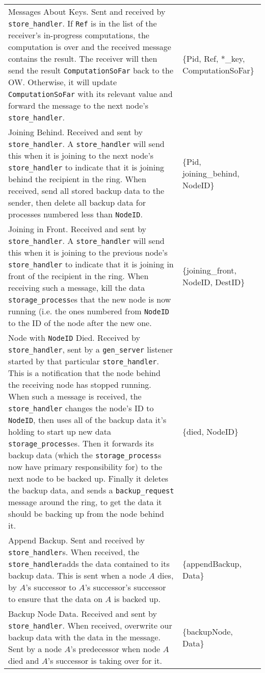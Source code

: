 \documentclass[12pt,letterpaper]{article}
\renewcommand{\tt}[1]{\texttt{#1}}
\newcommand{\sh}{\tt{store\_handler}}
\renewcommand{\sp}{\tt{storage\_process}}
\newcommand{\gs}{\tt{gen\_server}}
\begin{document}
\begin{longtable}{p{4.5in}T}
Messages About Keys.  Sent and received by \sh.  If \tt{Ref} is in the list of the receiver's in-progress computations, the computation is over and the received message contains the result. The receiver will then send the result \tt{ComputationSoFar} back to the OW.  Otherwise, it will update \tt{ComputationSoFar} with its relevant value and forward the message to the next node's \sh.  &
\{Pid, Ref, *\_key, ComputationSoFar\} \\

Joining Behind. Received and sent by \sh. A \sh{} will send this when it is joining to the next node's \sh{} to indicate that it is joining behind the recipient in the ring. When received, send all stored backup data to the sender, then delete all backup data for processes numbered less than \tt{NodeID}. &
\{Pid, joining\_behind, NodeID\} \\

Joining in Front.  Received and sent by \sh. A \sh{} will send this when it is joining to the previous node's \sh{} to indicate that it is joining in front of the recipient in the ring. When receiving such a message, %
kill the data \sp es that the new node is now running (i.e. the ones numbered from \tt{NodeID} to the ID of the node after the new one. &
\{joining\_front, NodeID, DestID\} \\

Node with \tt{NodeID} Died.  Received by \sh, sent by a \gs{} listener started by that particular \sh. This is a notification that the node behind the receiving node has stopped running. When such a message is received, the \sh{} changes the node's ID to \tt{NodeID}, then uses all of the backup data it's holding to start up new data \sp es. Then it forwards its backup data (which the \sp s now have primary responsibility for) to the next node to be backed up. Finally it deletes the backup data, and sends a \tt{backup\_request} message around the ring, to get the data it should be backing up from the node behind it. & \{died, NodeID\} \\

Append Backup. Sent and received by \sh s. When received, the \sh adds the data contained to its backup data. This is sent when a node $A$ dies, by $A$'s successor to $A$'s successor's successor to ensure that the data on $A$ is backed up. &
\{appendBackup, Data\}\\

Backup Node Data. Received and sent by \sh. When received, overwrite our backup data with the data in the message. Sent by a node $A$'s predecessor when node $A$ died and $A$'s successor is taking over for it.&
\{backupNode, Data\} \\


\end{longtable}
\end{document}
